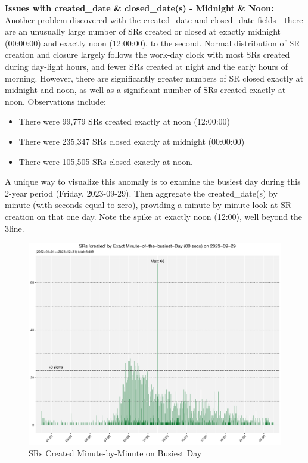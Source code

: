 \documentclass[12pt, titlepage]{article}
\begin{document}
		
\label{sec:midnightandnoon}
\textbf{Issues with created\_date \& closed\_date(s) - Midnight \& Noon:} Another 
problem discovered with the created\_date and 
closed\_date fields - there are an unusually large number of SRs 
created or closed at exactly midnight (00:00:00) and exactly noon (12:00:00), 
to the second. Normal distribution of SR creation and closure 
largely follows the work-day clock with most  SRs created during 
day-light hours, and fewer SRs 	created at night and the early hours 
of morning. However, there are significantly greater numbers 
of SR closed exactly at midnight and noon, as well as a significant 
number of SRs created exactly at noon. Observations include:

	
\begin{itemize}
	 \item There were 99,779 SRs created exactly at noon (12:00:00)
	
	 \item There were 235,347 SRs closed exactly at midnight (00:00:00)
	 
	\item There were 105,505 SRs closed exactly at noon. 
\end{itemize}


A unique way to visualize this anomaly is to examine the busiest day 
during this 2-year period (Friday, 2023-09-29). Then aggregate 
the created\_date(s) by minute (with seconds equal to zero), providing
a minute-by-minute look at SR creation on that one day. Note the spike 
at exactly noon (12:00), well beyond the 3\textsigma line.

\begin{figure}[tbp]
	\centering
	\includegraphics[width=\textwidth]
	{2-year-trend_SR_created_by_minute_of_busiest_day.pdf}
	\caption{SRs Created Minute-by-Minute on Busiest Day}
	\label{fig:busiestcreated}
\end{figure}	
\end{document}
